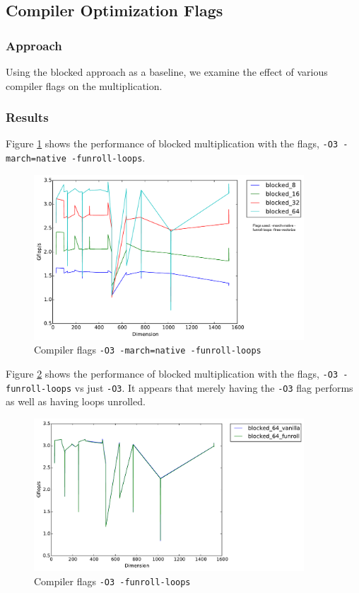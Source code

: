 \documentclass[11pt]{article}
\begin{document}
\subsection{Compiler Optimization Flags}
\subsubsection{Approach}
Using the blocked approach as a baseline, we examine the effect of various compiler flags on the multiplication.
\subsubsection{Results}
Figure \ref{all_optimized_blocked} shows the performance of blocked multiplication with the flags, \texttt{-O3 -march=native -funroll-loops}.
\begin{figure}[H]
    \includegraphics[width=0.9\textwidth]{timing_flags_blocked.pdf}
    \caption{Compiler flags \texttt{-O3 -march=native -funroll-loops}}
    \label{all_optimized_blocked}
\end{figure} 

Figure \ref{funroll_vanilla} shows the performance of blocked multiplication with the flags, \texttt{-O3 -funroll-loops} vs just \texttt{-O3}. It appears that merely having the \texttt{-O3} flag performs as well as having loops unrolled. 
\begin{figure}[H]
    \includegraphics[width=0.9\textwidth]{timing_funroll_vanilla.pdf}
    \caption{Compiler flags \texttt{-O3 -funroll-loops}}
    \label{funroll_vanilla}
\end{figure} 
\end{document}
